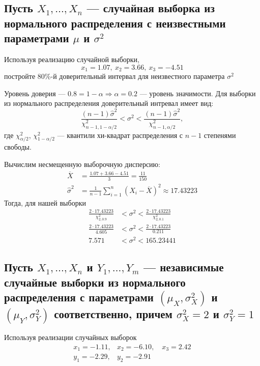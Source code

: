 \documentclass{article}
\begin{document}
\subsection{Пусть $X_{1}, \ldots, X_{n}$ — случайная выборка из нормального распределения с неизвестными параметрами $\mu$ и $\sigma^{2}$}
Используя реализацию случайной выборки,
\begin{equation*}
    x_{1}=1.07,\ x_{2}=3.66,\ x_{3}=-4.51
\end{equation*}
постройте $80 \%$-й доверительный интервал для неизвестного параметра $\sigma^{2}$

Уровень доверия — $0.8=1-\alpha\Longrightarrow\alpha=0.2$ — уровень значимости. Для выборки из нормального распределения доверительный интревал имеет вид:
\begin{equation*}
    \frac{(n - 1)\hat{\sigma}^2}{\chi^2_{n-1,1 - \alpha/2}}<\sigma^2< \frac{(n - 1)\hat{\sigma}^2}{\chi^2_{n-1,\alpha/2}},
\end{equation*}
где $\chi^2_{\alpha/2}$, $\chi^2_{1 - \alpha/2}$ — квантили хи-квадрат распределения с $n - 1$ степенями свободы.

Вычислим несмещенную выборочную дисперсию:
\begin{equation*}
    \begin{aligned}
        \overline{X}&=\frac{1.07+3.66-4.51}{3}=\frac{11}{150}\\
        \widehat{\sigma}^2&=\frac{1}{n-1}\sum_{i=1}^n\left(X_i-\overline{X}\right)^2\approx17.43223
    \end{aligned}
\end{equation*}
Тогда, для нашей выборки
\begin{equation*}
    \begin{aligned}
        \frac{2\cdot17.43223}{\chi^2_{2,0.9}}&<\sigma^2<\frac{2\cdot17.43223}{\chi^2_{2,0.1}}\\
        \frac{2\cdot17.43223}{4.605}&<\sigma^2<\frac{2\cdot17.43223}{0.211}\\
        7.571&<\sigma^2<165.23441
    \end{aligned}
\end{equation*}

\subsection{Пусть $X_{1}, \ldots, X_{n}$ и $Y_{1}, \ldots, Y_{m}$ — независимые случайные выборки из нормального распределения с параметрами $(\mu_{X}, \sigma_{X}^{2})$ и $(\mu_{Y}, \sigma_{Y}^{2})$ соответственно, причем $\sigma_{X}^{2}=2$ и $\sigma_{Y}^{2}=1$}
Используя реализации случайных выборок
\begin{equation*}
    \begin{array}{ll}
        x_{1}=-1.11, & x_{2}=-6.10, \quad x_{3}=2.42 \\
        y_{1}=-2.29, & y_{2}=-2.91
        \end{array}
\end{equation*}
\end{document}

